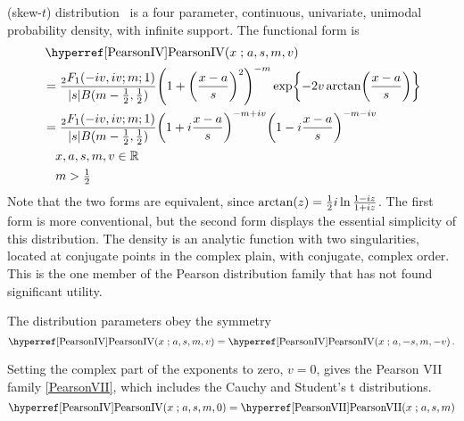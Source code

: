 

\clearpage
{}
\label{sec:PearsonIV}

 (skew-$t$) distribution~\cite{Pearson1895,Heinrich2004}
is a four parameter, continuous, univariate, unimodal probability density, with infinite support. The functional form is
\begin{align}
\label{PearsonIV}
& \opr{PearsonIV}(x\given a,s, m,v) 
\\ \notag &= \frac{{}_{2}F_1(-i v, i v ; m;1)  }{|s| B(m-\frac{1}{2}, \frac{1}{2} )}  
\Left( 1 +\Left( \frac{x-a}{s}\Right)^2 \Right)^{-m}  \exp \Left\{ - 2 v \arctan \Left( \frac{x-a}{s}\Right) \Right\}
\checked
\\ \notag &=  \frac{{}_{2}F_1(-i v, i v ; m;1)  }{|s| B(m-\frac{1}{2}, \frac{1}{2} )} 
\Left( 1 + i \frac{x-a}{s} \Right)^{-m+iv} \Left( 1 -i \frac{x-a}{s} \Right)^{-m-iv}
\checked
\\ \notag & \quad x,a,s,m,v \in {\mathbb R} 
\\ \notag & \quad m>\tfrac{1}{2}
\end{align}
Note that the two forms are equivalent, since $\arctan(z) = \tfrac{1}{2} i \ln \frac{1-i z}{1+iz}$. The first form is more conventional, but the second form displays  the essential simplicity of this distribution. The density is an analytic function with two singularities, located at conjugate points in  the complex plain, with conjugate, complex order. This is the one member of the Pearson distribution family that has not found  significant utility.



The distribution parameters obey the symmetry 
\[
\opr{PearsonIV}(x\given a,s, m,v) =\opr{PearsonIV}(x\given a,-s, m,-v)\, .\checked
\notag
\] 

Setting the complex part of the exponents to zero, $v=0$, gives the Pearson VII family \eqref{PearsonVII}, which includes the Cauchy and Student's t distributions. 
\[
\opr{PearsonIV}(x\given a,s, m,0) = \opr{PearsonVII}(x\given a,s, m)  \checked
\notag
\]

